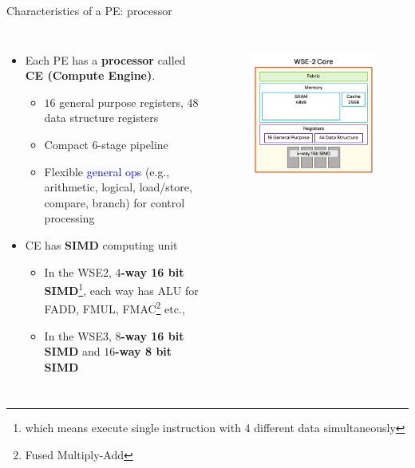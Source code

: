 \documentclass[dvipdfmx, 11pt, aspectratio=169]{beamer}   %
\begin{document}
\begin{frame}{Characteristics of a PE: processor}
\begin{columns}
\begin{itemize}
    \item Each PE has a \textbf{processor} called \textbf{CE (Compute Engine)}.
    \begin{itemize}
        \item $16$ general purpose registers, $48$ data structure registers
        \item Compact $6$-stage pipeline
        \item Flexible \textcolor{blue}{general ops} (e.g., arithmetic, logical, load/store, compare, branch) for control processing
    \end{itemize}
    \item CE has \textbf{SIMD} computing unit
    \begin{itemize}
        \item In the WSE2, \textbf{$4$-way 16 bit SIMD}\footnote{which means execute single instruction with 4 different data simultaneously}, each way has ALU for FADD, FMUL, FMAC\footnote{Fused Multiply-Add} etc.,
        \item In the WSE3, \textbf{$8$-way 16 bit SIMD} and \textbf{$16$-way 8 bit SIMD}
    \end{itemize}
\end{itemize}
\vspace{-\baselineskip}
\begin{figure}
    \includegraphics[scale=0.22]{img/wse2Core.png}\\

\end{figure}
\end{columns}
\end{frame}
\end{document}
